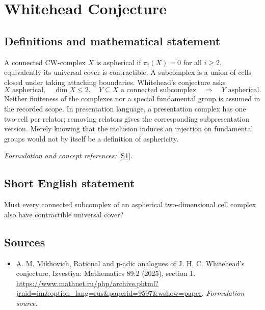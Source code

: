 \documentclass[11pt]{article}
\begin{document}
\section*{\texorpdfstring{Whitehead Conjecture}{Whitehead Conjecture}}\label{1486}
\subsection{Definitions and mathematical statement}
A connected CW-complex $X$ is aspherical if $\pi_i(X)=0$ for all $i\ge2$, equivalently its universal cover is contractible. A subcomplex is a union of cells closed under taking attaching boundaries. Whitehead's conjecture asks
\[
 X\text{ aspherical},\quad\dim X\le2,\quad
 Y\subseteq X\text{ a connected subcomplex}
 \quad\Longrightarrow\quad Y\text{ aspherical}.
\]
Neither finiteness of the complexes nor a special fundamental group is assumed in the recorded scope. In presentation language, a presentation complex has one two-cell per relator; removing relators gives the corresponding subpresentation version. Merely knowing that the inclusion induces an injection on fundamental groups would not by itself be a definition of asphericity.
\par\smallskip\textit{Formulation and concept references:} \href{https://www.mathnet.ru/php/archive.phtml?jrnid=im&option_lang=rus&paperid=9597&wshow=paper}{[S1]}.

\subsection{Short English statement}
Must every connected subcomplex of an aspherical two-dimensional cell complex also have contractible universal cover?
\subsection{Sources}
\begin{itemize}
\item[S1]A. M. Mikhovich, Rational and p-adic analogues of J. H. C. Whitehead's conjecture, Izvestiya: Mathematics 89:2 (2025), section 1.
\url{https://www.mathnet.ru/php/archive.phtml?jrnid=im&option_lang=rus&paperid=9597&wshow=paper}.
\textit{Formulation source.}
\end{itemize}
\end{document}

